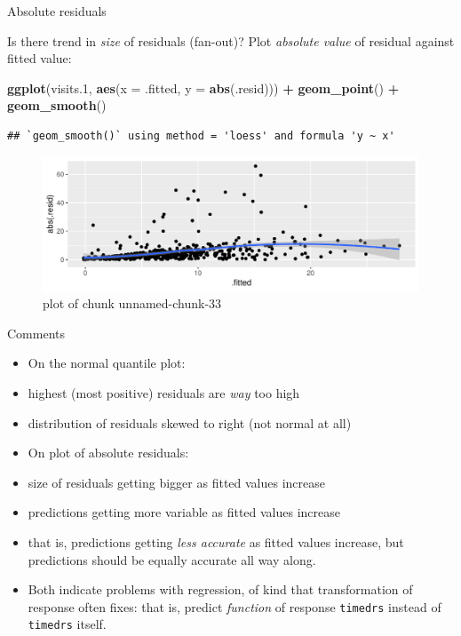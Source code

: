 \documentclass[ignorenonframetext,]{beamer}
\newenvironment{Shaded}{\begin{snugshade}}{\end{snugshade}}
\newcommand{\DataTypeTok}[1]{\textcolor[rgb]{0.13,0.29,0.53}{#1}}
\newcommand{\FloatTok}[1]{\textcolor[rgb]{0.00,0.00,0.81}{#1}}
\newcommand{\KeywordTok}[1]{\textcolor[rgb]{0.13,0.29,0.53}{\textbf{#1}}}
\newcommand{\NormalTok}[1]{#1}
\newcommand{\OperatorTok}[1]{\textcolor[rgb]{0.81,0.36,0.00}{\textbf{#1}}}
\newcommand{\StringTok}[1]{\textcolor[rgb]{0.31,0.60,0.02}{#1}}
\begin{document}
\begin{frame}[fragile]{Absolute residuals}
\protect\hypertarget{absolute-residuals}{}

Is there trend in \emph{size} of residuals (fan-out)? Plot
\emph{absolute value} of residual against fitted value:

\begin{Shaded}
\begin{Highlighting}[]
\KeywordTok{ggplot}\NormalTok{(visits}\FloatTok{.1}\NormalTok{, }\KeywordTok{aes}\NormalTok{(}\DataTypeTok{x =}\NormalTok{ .fitted, }\DataTypeTok{y =} \KeywordTok{abs}\NormalTok{(.resid))) }\OperatorTok{+}
\StringTok{  }\KeywordTok{geom_point}\NormalTok{() }\OperatorTok{+}\StringTok{ }\KeywordTok{geom_smooth}\NormalTok{()}
\end{Highlighting}
\end{Shaded}

\begin{verbatim}
## `geom_smooth()` using method = 'loess' and formula 'y ~ x'
\end{verbatim}

\begin{figure}
\centering
\includegraphics{figure/unnamed-chunk-33-1.pdf}
\caption{plot of chunk unnamed-chunk-33}
\end{figure}

\end{frame}

\begin{frame}[fragile]{Comments}
\protect\hypertarget{comments-3}{}

\begin{itemize}
\item
  On the normal quantile plot:
\item
  highest (most positive) residuals are \emph{way} too high
\item
  distribution of residuals skewed to right (not normal at all)
\item
  On plot of absolute residuals:
\item
  size of residuals getting bigger as fitted values increase
\item
  predictions getting more variable as fitted values increase
\item
  that is, predictions getting \emph{less accurate} as fitted values
  increase, but predictions should be equally accurate all way along.
\item
  Both indicate problems with regression, of kind that transformation of
  response often fixes: that is, predict \emph{function} of response
  \texttt{timedrs} instead of \texttt{timedrs} itself.
\end{itemize}

\end{frame}
\end{document}
